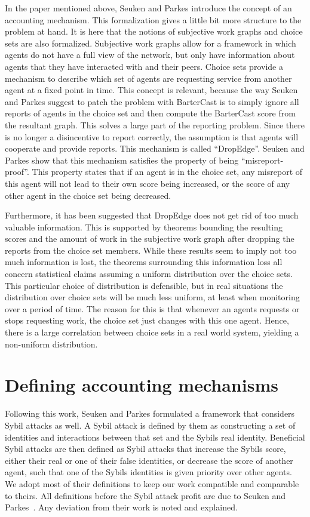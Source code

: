 \documentclass[a4paper,11pt]{book}
\theoremstyle{definition}
\begin{document}
In the paper mentioned above, Seuken and Parkes introduce the concept of an accounting mechanism. This formalization gives
a little bit more structure to the problem at hand. It is here that the notions of subjective work graphs
and choice sets are also formalized. Subjective work graphs allow for a framework in which agents
do not have a full view of the network, but only have information about agents that they have interacted
with and their peers. Choice sets provide a mechanism to describe which set of agents are requesting
service from another agent at a fixed point in time. 
This concept is relevant, because the way
Seuken and Parkes suggest to patch the problem with BarterCast is to simply ignore all reports of agents
in the choice set and then compute the BarterCast score from the resultant graph.
This solves a large part of the reporting problem. Since there is no longer a disincentive
to report correctly, the assumption is that agents will cooperate and provide reports.
This mechanism is called ``DropEdge''. Seuken and Parkes show that this mechanism satisfies the property
of being ``misreport-proof''. This property states that if an agent is in the choice set, 
any misreport of this agent will not lead to their own score being increased, or the score of
any other agent in the choice set being decreased.

Furthermore, it has been suggested that DropEdge does not get rid of too much valuable information.
This is supported by theorems bounding the resulting scores and the amount of work in the subjective
work graph after dropping the reports from the choice set members. While these results seem to imply
not too much information is lost, the theorems surrounding this information loss all concern statistical
claims assuming a uniform distribution over the choice sets. This particular choice of distribution is
defensible, but in real situations the distribution over choice sets will be much less uniform, at least
when monitoring over a period of time. The reason for this is that whenever an agents requests or
stops requesting work, the choice set just changes with this one agent. Hence, there is a large
correlation between choice sets in a real world system, yielding a non-uniform distribution.

\section{Defining accounting mechanisms}

Following this work, Seuken and Parkes \cite{seuken2014Sybil} formulated a framework that considers Sybil attacks as well. 
A Sybil attack is defined by them as 
constructing a set of identities and interactions between that set and the Sybils real identity.
Beneficial Sybil attacks are then defined as Sybil attacks that increase the Sybils score, either their real or one of
their false identities, or decrease the score of another  agent, such that one of the Sybils identities
is given priority over other agents. We adopt most of their definitions to keep our work compatible and comparable to
theirs. All definitions before the Sybil attack profit are due to Seuken and Parkes~\cite{seuken2014Sybil}. Any deviation
from their work is noted and explained.
\end{document}
